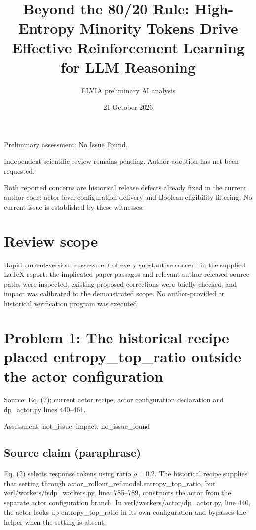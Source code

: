 \documentclass[11pt]{article}
\begin{document}
\title{Beyond the 80/20 Rule: High-Entropy Minority Tokens Drive Effective Reinforcement Learning for LLM Reasoning}

\author{ELVIA preliminary AI analysis}\date{21 October 2026}\maketitle

Preliminary assessment: No Issue Found.\par

Independent scientific review remains pending. Author adoption has not been requested.

Both reported concerns are historical release defects already fixed in the current author code: actor-level configuration delivery and Boolean eligibility filtering. No current issue is established by these witnesses.

\section*{Review scope}

Rapid current-version reassessment of every substantive concern in the supplied LaTeX report: the implicated paper passages and relevant author-released source paths were inspected, existing proposed corrections were briefly checked, and impact was calibrated to the demonstrated scope. No author-provided or historical verification program was executed.

\section*{Problem 1: The historical recipe placed entropy\_top\_ratio outside the actor configuration}

Source: Eq. (2); current actor recipe, actor configuration declaration and dp\_actor.py lines 440–461.

Assessment: not\_issue; impact: no\_issue\_found

\subsection*{Source claim (paraphrase)}

Eq. (2) selects response tokens using ratio \(\rho=0.2\). The historical recipe supplies that setting through actor\_rollout\_ref.model.entropy\_top\_ratio, but verl/workers/fsdp\_workers.py, lines 785–789, constructs the actor from the separate actor configuration branch. In verl/workers/actor/dp\_actor.py, line 440, the actor looks up entropy\_top\_ratio in its own configuration and bypasses the helper when the setting is absent.
\end{document}
